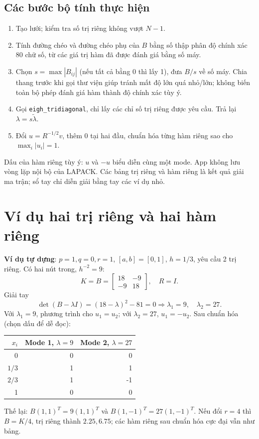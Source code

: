 \subsection{Các bước bộ tính thực hiện}
\begin{enumerate}
\item Tạo lưới; kiểm tra số trị riêng không vượt $N-1$.
\item Tính đường chéo và đường chéo phụ của $B$ bằng số thập phân độ chính xác 80 chữ số, từ các giá trị hàm đã được đánh giá bằng số máy.
\item Chọn $s=\max|B_{ij}|$ (nếu tất cả bằng 0 thì lấy 1), đưa $B/s$ về số máy. Chia thang trước khi gọi thư viện giúp tránh mất độ lớn quá nhỏ/lớn; không biến toàn bộ phép đánh giá hàm thành độ chính xác tùy ý.
\item Gọi \texttt{eigh\_tridiagonal}, chỉ lấy các chỉ số trị riêng được yêu cầu. Trả lại $\lambda=s\widetilde\lambda$.
\item Đổi $u=R^{-1/2}v$, thêm 0 tại hai đầu, chuẩn hóa từng hàm riêng sao cho $\max_i|u_i|=1$.
\end{enumerate}
Dấu của hàm riêng tùy ý: $u$ và $-u$ biểu diễn cùng một mode. App không lưu vòng lặp nội bộ của LAPACK. Các bảng trị riêng và hàm riêng là kết quả giải ma trận; sổ tay chỉ diễn giải bằng tay các ví dụ nhỏ.

\section{Ví dụ hai trị riêng và hai hàm riêng}
\textbf{Ví dụ tự dựng}: $p=1,q=0,r=1$, $[a,b]=[0,1]$, $h=1/3$, yêu cầu 2 trị riêng. Có hai nút trong, $h^{-2}=9$:
\[
 K=B=\begin{bmatrix}18&-9\\-9&18\end{bmatrix},\quad R=I.
\]
Giải tay
\[
 \det(B-\lambda I)=(18-\lambda)^2-81=0
 \Longrightarrow\lambda_1=9,\quad\lambda_2=27.
\]
Với $\lambda_1=9$, phương trình cho $u_1=u_2$; với $\lambda_2=27$, $u_1=-u_2$. Sau chuẩn hóa (chọn dấu để dễ đọc):
\begin{center}\begin{tabular}{rrr}\toprule
$x_i$&Mode 1, $\lambda=9$&Mode 2, $\lambda=27$\\\midrule
0&0&0\\
$1/3$&1&1\\
$2/3$&1&-1\\
1&0&0\\\bottomrule
\end{tabular}\end{center}
Thế lại: $B(1,1)^T=9(1,1)^T$ và $B(1,-1)^T=27(1,-1)^T$. Nếu đổi $r=4$ thì $B=K/4$, trị riêng thành $2.25,6.75$; các hàm riêng sau chuẩn hóa cực đại vẫn như bảng.

